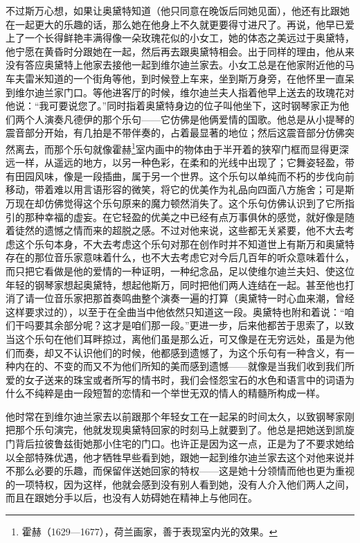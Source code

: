 \par 不过斯万心想，如果让奥黛特知道（他只同意在晚饭后同她见面），他还有比跟她在一起更大的乐趣的话，那么她在他身上不久就更要得寸进尺了。再说，他早已爱上了一个长得鲜艳丰满得像一朵玫瑰花似的小女工，她的体态之美远过于奥黛特，他宁愿在黄昏时分跟她在一起，然后再去跟奥黛特相会。出于同样的理由，他从来没有答应奥黛特上他家去接他一起到维尔迪兰家去。小女工总是在他家附近他的马车夫雷米知道的一个街角等他，到时候登上车来，坐到斯万身旁，在他怀里一直呆到维尔迪兰家门口。等他进客厅的时候，维尔迪兰夫人指着他早上送去的玫瑰花对他说：“我可要说您了。”同时指着奥黛特身边的位子叫他坐下，这时钢琴家正为他们两个人演奏凡德伊的那个乐句——它仿佛是他俩爱情的国歌。他总是从小提琴的震音部分开始，有几拍是不带伴奏的，占着最显著的地位；然后这震音部分仿佛突然离去，而那个乐句就像霍赫\footnote{霍赫（1629—1677），荷兰画家，善于表现室内光的效果。}室内画中的物体由于半开着的狭窄门框而显得更深远一样，从遥远的地方，以另一种色彩，在柔和的光线中出现了；它舞姿轻盈，带有田园风味，像是一段插曲，属于另一个世界。这个乐句以单纯而不朽的步伐向前移动，带着难以用言语形容的微笑，将它的优美作为礼品向四面八方施舍；可是斯万现在却仿佛觉得这个乐句原来的魔力顿然消失了。这个乐句仿佛认识到了它所指引的那种幸福的虚妄。在它轻盈的优美之中已经有点万事俱休的感觉，就好像是随着徒然的遗憾之情而来的超脱之感。不过对他来说，这些都无关紧要，他不大去考虑这个乐句本身，不大去考虑这个乐句对那在创作时并不知道世上有斯万和奥黛特存在的那位音乐家意味着什么，也不大去考虑它对今后几百年的听众意味着什么，而只把它看做是他的爱情的一种证明，一种纪念品，足以使维尔迪兰夫妇、使这位年轻的钢琴家想起奥黛特，想起他斯万，同时把他们两人连结在一起。甚至他也打消了请一位音乐家把那首奏鸣曲整个演奏一遍的打算（奥黛特一时心血来潮，曾经这样要求过的），以至于在全曲当中他依然只知道这一段。奥黛特也附和着说：“咱们干吗要其余部分呢？这才是咱们那一段。”更进一步，后来他都苦于思索了，以致当这个乐句在他们耳畔掠过，离他们虽是那么近，可又像是在无穷远处，虽是为他们而奏，却又不认识他们的时候，他都感到遗憾了，为这个乐句有一种含义，有一种内在的、不变的而又不为他们所知的美而感到遗憾——就像是当我们收到我们所爱的女子送来的珠宝或者所写的情书时，我们会怪怨宝石的水色和语言中的词语为什么不纯粹是由一段短暂的恋情和一个举世无双的情人的精髓所构成一样。
\par 他时常在到维尔迪兰家去以前跟那个年轻女工在一起呆的时间太久，以致钢琴家刚把那个乐句演完，他就发现奥黛特回家的时刻马上就要到了。他总是把她送到凯旋门背后拉彼鲁兹街她那小住宅的门口。也许正是因为这一点，正是为了不要求她给以全部特殊优遇，他才牺牲早些看到她，跟她一起到维尔迪兰家去这个对他来说并不那么必要的乐趣，而保留伴送她回家的特权——这是她十分领情而他也更为重视的一项特权，因为这样，他就会感到没有别人看到她，没有人介入他们两人之间，而且在跟她分手以后，也没有人妨碍她在精神上与他同在。
